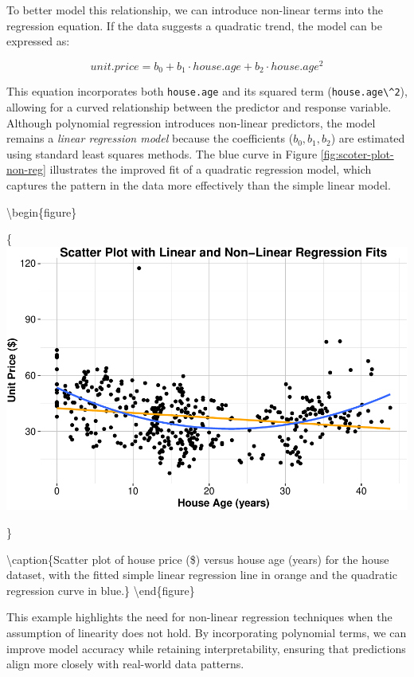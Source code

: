 \documentclass[
]{book}
\newcommand{\passthrough}[1]{#1}
\theoremstyle{definition}
\theoremstyle{definition}
\theoremstyle{definition}
\theoremstyle{definition}
\theoremstyle{remark}
\begin{document}
To better model this relationship, we can introduce non-linear terms into the regression equation. If the data suggests a quadratic trend, the model can be expressed as:

\[
unit.price = b_0 + b_1 \cdot house.age + b_2 \cdot house.age^2
\]

This equation incorporates both \passthrough{\lstinline!house.age!} and its squared term (\passthrough{\lstinline!house.age\^2!}), allowing for a curved relationship between the predictor and response variable. Although polynomial regression introduces non-linear predictors, the model remains a \emph{linear regression model} because the coefficients (\(b_0, b_1, b_2\)) are estimated using standard least squares methods. The blue curve in Figure \ref{fig:scoter-plot-non-reg} illustrates the improved fit of a quadratic regression model, which captures the pattern in the data more effectively than the simple linear model.

\textbackslash begin\{figure\}

\{\centering \includegraphics[width=1\linewidth]{regression_files/figure-latex/scoter-plot-non-reg-1}

\}

\textbackslash caption\{Scatter plot of house price (\$) versus house age (years) for the house dataset, with the fitted simple linear regression line in orange and the quadratic regression curve in blue.\}\label{fig:scoter-plot-non-reg}
\textbackslash end\{figure\}

This example highlights the need for non-linear regression techniques when the assumption of linearity does not hold. By incorporating polynomial terms, we can improve model accuracy while retaining interpretability, ensuring that predictions align more closely with real-world data patterns.
\end{document}
